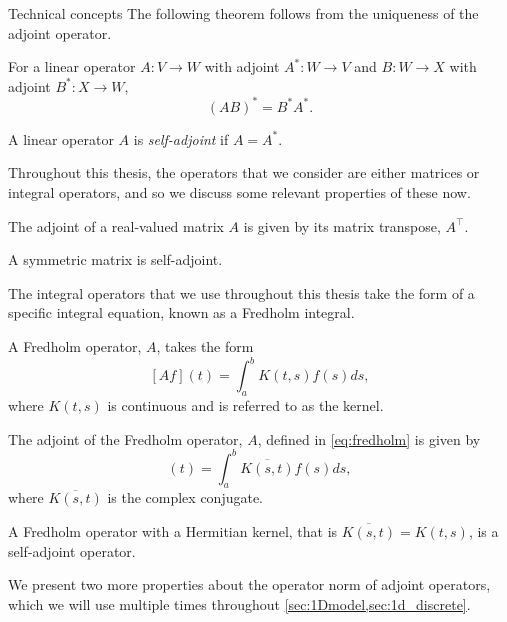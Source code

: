 \begin{section}{Technical concepts \label{sec:tc}}
The following theorem follows from the uniqueness of the adjoint operator.
\begin{theorem}
	For a linear operator $A:V \to W$ with adjoint $A^*:W \to V$ and $B:W\to X$ with adjoint $B^*:X \to W$, 
	\begin{equation*}
	\left(AB\right)^* = B^* A^*.
	\end{equation*}
\end{theorem}

\begin{definition}
	A linear operator $A$ is \emph{self-adjoint} if $A=A^*$.
\end{definition}

Throughout this thesis, the operators that we consider are either matrices or integral operators, and so we discuss some relevant properties of these now.

\begin{theorem}
	The adjoint of a real-valued matrix $A$ is given by its matrix transpose, $A^\top$.
\end{theorem}
\begin{corollary}
	A symmetric matrix is self-adjoint.
\end{corollary}

The integral operators that we use throughout this thesis take the form of a specific integral equation, known as a Fredholm integral.

\begin{definition}
	A Fredholm operator, $A$, takes the form
	\begin{equation}
	\label{eq:fredholm}
	[Af](t)  = \int_a^b K(t,s)f(s)ds,
	\end{equation}
	where $K(t,s)$ is continuous and is referred to as the kernel.
\end{definition}
\begin{theorem}
	The adjoint of the Fredholm operator, $A$, defined in \cref{eq:fredholm} is given by
	\begin{equation*}
	[A^* f](t)  = \int_a^b \overline{K(s,t)}f(s)ds			,
	\end{equation*}
	where $\overline{K(s,t)}$ is the complex conjugate.
\end{theorem}
\begin{corollary}
	\label{thm:fredholmselfadjoint}
	A Fredholm operator with a Hermitian kernel, that is $\overline{K(s,t)} = K(t,s)$, is a self-adjoint operator.
\end{corollary}

We present two more properties about the operator norm of adjoint operators, which we will use multiple times throughout \cref{sec:1Dmodel,sec:1d_discrete}.


\end{section}
